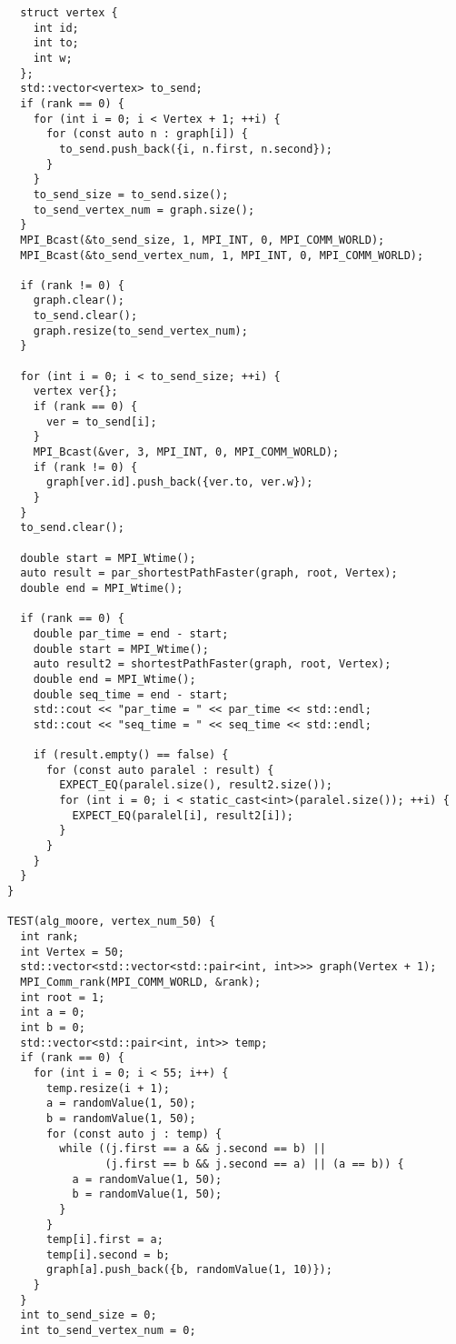 \documentclass{report}
\begin{document}
\begin{lstlisting}
  struct vertex {
    int id;
    int to;
    int w;
  };
  std::vector<vertex> to_send;
  if (rank == 0) {
    for (int i = 0; i < Vertex + 1; ++i) {
      for (const auto n : graph[i]) {
        to_send.push_back({i, n.first, n.second});
      }
    }
    to_send_size = to_send.size();
    to_send_vertex_num = graph.size();
  }
  MPI_Bcast(&to_send_size, 1, MPI_INT, 0, MPI_COMM_WORLD);
  MPI_Bcast(&to_send_vertex_num, 1, MPI_INT, 0, MPI_COMM_WORLD);

  if (rank != 0) {
    graph.clear();
    to_send.clear();
    graph.resize(to_send_vertex_num);
  }

  for (int i = 0; i < to_send_size; ++i) {
    vertex ver{};
    if (rank == 0) {
      ver = to_send[i];
    }
    MPI_Bcast(&ver, 3, MPI_INT, 0, MPI_COMM_WORLD);
    if (rank != 0) {
      graph[ver.id].push_back({ver.to, ver.w});
    }
  }
  to_send.clear();

  double start = MPI_Wtime();
  auto result = par_shortestPathFaster(graph, root, Vertex);
  double end = MPI_Wtime();

  if (rank == 0) {
    double par_time = end - start;
    double start = MPI_Wtime();
    auto result2 = shortestPathFaster(graph, root, Vertex);
    double end = MPI_Wtime();
    double seq_time = end - start;
    std::cout << "par_time = " << par_time << std::endl;
    std::cout << "seq_time = " << seq_time << std::endl;

    if (result.empty() == false) {
      for (const auto paralel : result) {
        EXPECT_EQ(paralel.size(), result2.size());
        for (int i = 0; i < static_cast<int>(paralel.size()); ++i) {
          EXPECT_EQ(paralel[i], result2[i]);
        }
      }
    }
  }
}

TEST(alg_moore, vertex_num_50) {
  int rank;
  int Vertex = 50;
  std::vector<std::vector<std::pair<int, int>>> graph(Vertex + 1);
  MPI_Comm_rank(MPI_COMM_WORLD, &rank);
  int root = 1;
  int a = 0;
  int b = 0;
  std::vector<std::pair<int, int>> temp;
  if (rank == 0) {
    for (int i = 0; i < 55; i++) {
      temp.resize(i + 1);
      a = randomValue(1, 50);
      b = randomValue(1, 50);
      for (const auto j : temp) {
        while ((j.first == a && j.second == b) ||
               (j.first == b && j.second == a) || (a == b)) {
          a = randomValue(1, 50);
          b = randomValue(1, 50);
        }
      }
      temp[i].first = a;
      temp[i].second = b;
      graph[a].push_back({b, randomValue(1, 10)});
    }
  }
  int to_send_size = 0;
  int to_send_vertex_num = 0;


\end{lstlisting}
\end{document}
